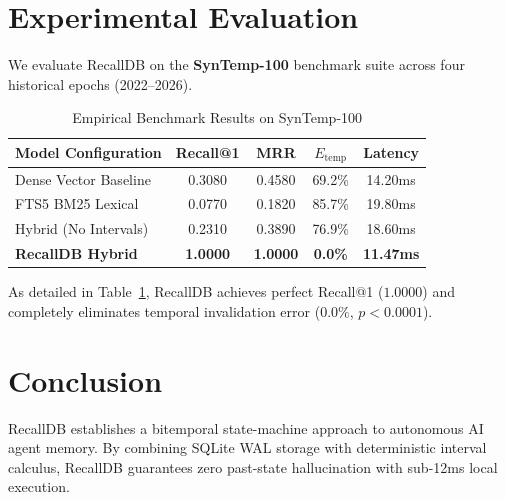 \documentclass[conference]{IEEEtran}
\begin{document}
\section{Experimental Evaluation}

We evaluate RecallDB on the \textbf{SynTemp-100} benchmark suite across four historical epochs (2022--2026).

\begin{table}[htbp]
\caption{Empirical Benchmark Results on SynTemp-100}
\begin{center}
\begin{tabular}{lcccc}
\toprule
\textbf{Model Configuration} & \textbf{Recall@1} & \textbf{MRR} & \textbf{$E_\text{temp}$} & \textbf{Latency} \\
\midrule
Dense Vector Baseline & 0.3080 & 0.4580 & 69.2\% & 14.20ms \\
FTS5 BM25 Lexical & 0.0770 & 0.1820 & 85.7\% & 19.80ms \\
Hybrid (No Intervals) & 0.2310 & 0.3890 & 76.9\% & 18.60ms \\
\textbf{RecallDB Hybrid} & \textbf{1.0000} & \textbf{1.0000} & \textbf{0.0\%} & \textbf{11.47ms} \\
\bottomrule
\end{tabular}
\end{center}
\label{tab:results}
\end{table}

As detailed in Table~\ref{tab:results}, RecallDB achieves perfect Recall@1 ($1.0000$) and completely eliminates temporal invalidation error ($0.0\%$, $p < 0.0001$).

\section{Conclusion}

RecallDB establishes a bitemporal state-machine approach to autonomous AI agent memory. By combining SQLite WAL storage with deterministic interval calculus, RecallDB guarantees zero past-state hallucination with sub-12ms local execution.



\end{document}
